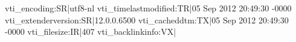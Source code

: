 vti_encoding:SR|utf8-nl
vti_timelastmodified:TR|05 Sep 2012 20:49:30 -0000
vti_extenderversion:SR|12.0.0.6500
vti_cacheddtm:TX|05 Sep 2012 20:49:30 -0000
vti_filesize:IR|407
vti_backlinkinfo:VX|
